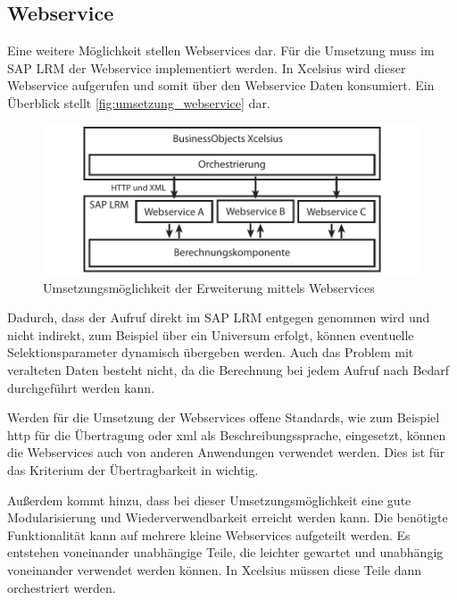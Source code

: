 \begin{onehalfspacing}
\section{Webservice}
Eine weitere Möglichkeit stellen Webservices dar. Für die Umsetzung muss im SAP LRM der Webservice implementiert werden. In \gls{Xcelsius} wird dieser Webservice aufgerufen und somit über den Webservice Daten konsumiert. Ein Überblick stellt \vref{fig:umsetzung_webservice} dar.

\begin{figure}[!ht]
\centering
\setlength{\unitlength}{1mm}
\includegraphics[width=15cm]{images/Abbildung10-Umsetzung-Webservices.pdf}
\caption{Umsetzungsmöglichkeit der Erweiterung mittels Webservices \label{fig:umsetzung_webservice}}
\end{figure} 

Dadurch, dass der Aufruf direkt im SAP LRM entgegen genommen wird und nicht indirekt, zum Beispiel über ein Universum erfolgt, können eventuelle Selektionsparameter dynamisch übergeben werden. Auch das Problem mit veralteten Daten besteht nicht, da die Berechnung bei jedem Aufruf nach Bedarf durchgeführt werden kann.

Werden für die Umsetzung der Webservices offene Standards, wie zum Beispiel \gls{http} für die Übertragung oder \gls{xml} als Beschreibungssprache,  eingesetzt, können die Webservices auch von anderen Anwendungen verwendet werden. Dies ist für das Kriterium der Übertragbarkeit in  wichtig.

Außerdem kommt hinzu, dass bei dieser Umsetzungsmöglichkeit eine gute Modularisierung und Wiederverwendbarkeit erreicht werden kann. Die benötigte Funktionalität kann auf mehrere kleine Webservices aufgeteilt werden. Es entstehen voneinander unabhängige Teile, die leichter gewartet und unabhängig voneinander verwendet werden können. In \gls{Xcelsius} müssen diese Teile dann orchestriert werden.


\end{onehalfspacing}
